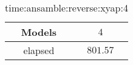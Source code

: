 \begin{table}[!ht]
	\centering
	\begin{tabular}{|c|c|}
		\hline
		Models & $4$ \\ \hline
		elapsed & $801.57$ \\ \hline
	\end{tabular}
	\caption{time:ansamble:reverse:xyap:4}
	\label{tab:time:ansamble:reverse:xyap:4}
\end{table}
